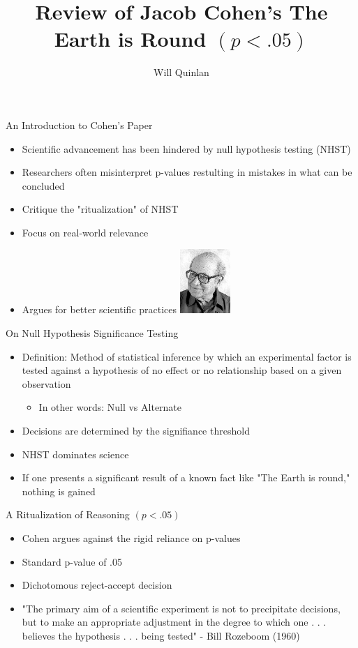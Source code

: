 \documentclass[aspectratio=169, 12pt]{beamer}
\title{Review of Jacob Cohen's The Earth is Round $(p < .05)$}
\author{Will Quinlan}
\begin{document}
\frame{\titlepage}

\begin{frame}{An Introduction to Cohen's Paper}
  \begin{itemize}
  \item Scientific advancement has been hindered by null hypothesis testing (NHST)
  \item Researchers often misinterpret p-values restulting in mistakes in what can be concluded
  \item Critique the "ritualization" of NHST 
  \item Focus on real-world relevance
  \item Argues for better scientific practices
  \includegraphics[width=0.15\textwidth]{./images/JacobCohen.png}
  \end{itemize}
\end{frame}

\begin{frame}{On Null Hypothesis Significance Testing}
  \begin{itemize}
  \item Definition: Method of statistical inference by which an experimental factor is tested against a hypothesis of no effect or no relationship based on a given observation
	\begin{itemize}
	\item In other words: Null vs Alternate
	\end{itemize}
  \item Decisions are determined by the signifiance threshold
  \item NHST dominates science
  \item If one presents a significant result of a known fact like "The Earth is round," nothing is gained
  \end{itemize}
\end{frame}

\begin{frame}{A Ritualization of Reasoning $(p < .05)$}
  \begin{itemize}
  \item Cohen argues against the rigid reliance on p-values
  \item Standard p-value of .05
  \item Dichotomous reject-accept decision
  \item "The primary aim of a scientific experiment is not to precipitate decisions, but to make an appropriate adjustment in the degree to which one . . . believes the hypothesis . . . being
tested" - Bill Rozeboom (1960)
  \end{itemize}
\end{frame}
\end{document}
